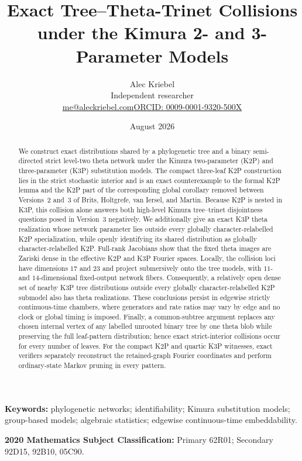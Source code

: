 \documentclass[11pt]{article}
\title{Exact Tree--Theta-Trinet Collisions\\under the Kimura 2- and 3-Parameter Models}
\author{Alec Kriebel\\[-1mm]\small Independent researcher\\[-1mm]\small\href{mailto:me@aleckriebel.com}{me@aleckriebel.com}\quad\textbar\quad\href{https://orcid.org/0009-0001-9320-500X}{ORCID: 0009-0001-9320-500X}}
\date{August 2026}
\theoremstyle{remark}\newtheorem{remark}[theorem]{Remark}
\begin{document}
\maketitle
\begin{abstract}
We construct exact distributions shared by a phylogenetic tree and a binary semi-directed strict level-two theta network under the Kimura two-parameter (K2P) and three-parameter (K3P) substitution models. The compact three-leaf K2P construction lies in the strict stochastic interior and is an exact counterexample to the formal K2P lemma and the K2P part of the corresponding global corollary removed between Versions~2 and~3 of Brits, Holtgrefe, van Iersel, and Martin. Because K2P is nested in K3P, this collision alone answers both high-level Kimura tree--trinet disjointness questions posed in Version~3 negatively. We additionally give an exact K3P theta realization whose network parameter lies outside every globally character-relabelled K2P specialization, while openly identifying its shared distribution as globally character-relabelled K2P. Full-rank Jacobians show that the fixed theta images are Zariski dense in the effective K2P and K3P Fourier spaces. Locally, the collision loci have dimensions $17$ and $23$ and project submersively onto the tree models, with $11$- and $14$-dimensional fixed-output network fibers. Consequently, a relatively open dense set of nearby K3P tree distributions outside every globally character-relabelled K2P submodel also has theta realizations. These conclusions persist in edgewise strictly continuous-time chambers, where generators and rate ratios may vary by edge and no clock or global timing is imposed. Finally, a common-subtree argument replaces any chosen internal vertex of any labelled unrooted binary tree by one theta blob while preserving the full leaf-pattern distribution; hence exact strict-interior collisions occur for every number of leaves. For the compact K2P and quartic K3P witnesses, exact verifiers separately reconstruct the retained-graph Fourier coordinates and perform ordinary-state Markov pruning in every pattern.
\end{abstract}
\noindent\textbf{Keywords:} phylogenetic networks; identifiability; Kimura substitution models; group-based models; algebraic statistics; edgewise continuous-time embeddability.

\medskip
\noindent\textbf{2020 Mathematics Subject Classification:} Primary 62R01; Secondary 92D15, 92B10, 05C90.
\end{document}
